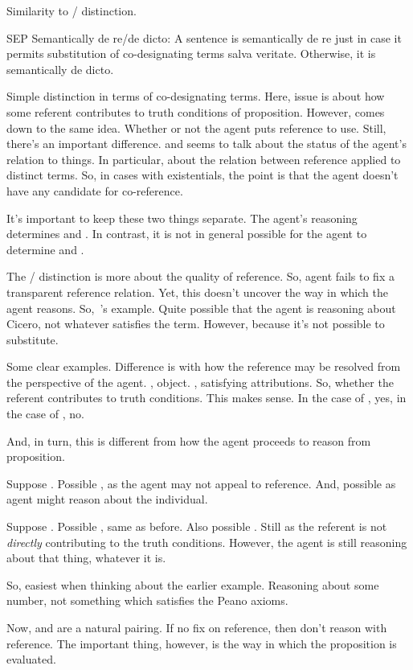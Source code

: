 \begin{note}
  Similarity to \dd{}/\dr{} distinction.

  SEP
  Semantically de re/de dicto:
  A sentence is semantically de re just in case it permits substitution of co-designating terms salva veritate.
  Otherwise, it is semantically de dicto.

  Simple distinction in terms of co-designating terms.
  Here, issue is about how some referent contributes to truth conditions of proposition.
  However, comes down to the same idea.
  Whether or not the agent puts reference to use.
  Still, there's an important difference.
  \dd{} and \dr{} seems to talk about the status of the agent's relation to things.
  In particular, about the relation between reference applied to distinct terms.
  So, in cases with existentials, the point is that the agent doesn't have any candidate for co-reference.

  It's important to keep these two things separate.
  The agent's reasoning determines \ur{} and \nr{}.
  In contrast, it is not in general possible for the agent to determine \dd{} and \dr{}.

  The \dd{}/\dr{} distinction is more about the quality of reference.
  So, agent fails to fix a transparent reference relation.
  Yet, this doesn't uncover the way in which the agent reasons.
  So,~\citeauthor{Fitch:1981vg}'s example.
  Quite possible that the agent is reasoning about Cicero, not whatever satisfies the term.
  However, \dd{} because it's not possible to substitute.

  Some clear examples.
  Difference is with how the reference may be resolved from the perspective of the agent.
  \dr{}, object.
  \dd{}, satisfying attributions.
  So, whether the referent contributes to truth conditions.
  This makes sense.
  In the case of \dr{}, yes, in the case of \dd{}, no.

  And, in turn, this is different from how the agent proceeds to reason from proposition.

  Suppose \dr{}.
  Possible \nr{}, as the agent may not appeal to reference.
  And, possible \ur{} as agent might reason about the individual.

  Suppose \dd{}.
  Possible \nr{}, same as before.
  Also possible \ur{}.
  Still \dd{} as the referent is not \emph{directly} contributing to the truth conditions.
  However, the agent is still reasoning about that thing, whatever it is.

  So, easiest when thinking about the earlier example.
  Reasoning about some number, not something which satisfies the Peano axioms.

  Now, \dd{} and \nr{} are a natural pairing.
  If no fix on reference, then don't reason with reference.
  The important thing, however, is the way in which the proposition is evaluated.
\end{note}

